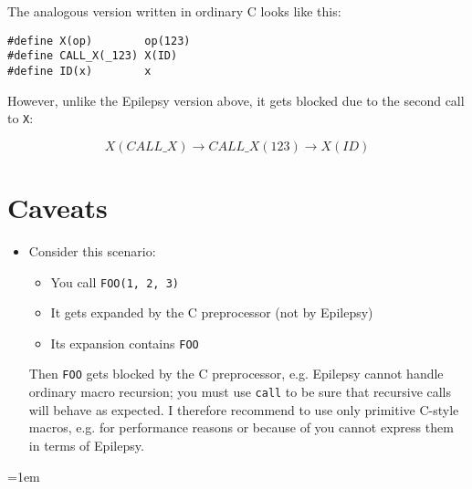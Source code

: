 \documentclass[12pt]{article}
\theoremstyle{break}
\begin{document}
The analogous version written in ordinary C looks like this:

\begin{verbatim}
#define X(op)        op(123)
#define CALL_X(_123) X(ID)
#define ID(x)        x
\end{verbatim}

However, unlike the Epilepsy version above, it gets blocked due to the
second call to \texttt{X}:

$$
X(CALL\_X) \to CALL\_X(123) \to X(ID)
$$

\section{Caveats}

\begin{itemize}
\item Consider this scenario:
    \begin{itemize}
        \item You call \texttt{FOO(1, 2, 3)}
        \item It gets expanded by the C preprocessor (not by Epilepsy)
        \item Its expansion contains \texttt{FOO}
    \end{itemize}
Then \texttt{FOO} gets blocked by the C preprocessor, e.g. Epilepsy cannot handle ordinary
macro recursion; you must use \texttt{call} to be sure that recursive calls
will behave as expected. I therefore recommend to use only primitive C-style macros, e.g.
for performance reasons or because of you cannot express them in terms of Epilepsy.
\end{itemize}

\emergencystretch=1em
\printbibliography
\end{document}
